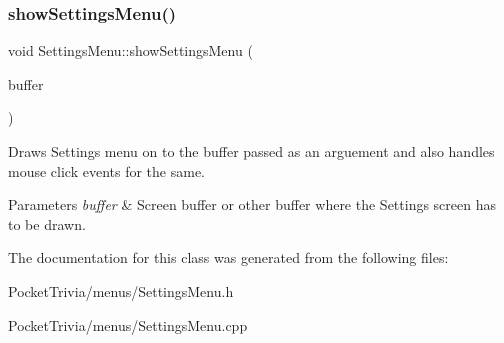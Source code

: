 \subsubsection{\texorpdfstring{showSettingsMenu()}{showSettingsMenu()}}
{\footnotesize\ttfamily void Settings\+Menu\+::show\+Settings\+Menu (\begin{DoxyParamCaption}\item[{B\+I\+T\+M\+AP $\ast$}]{buffer }\end{DoxyParamCaption})}



Draws Settings menu on to the buffer passed as an arguement and also handles mouse click events for the same. 


\begin{DoxyParams}{Parameters}
{\em buffer} & Screen buffer or other buffer where the Settings screen has to be drawn. \\
\hline
\end{DoxyParams}


The documentation for this class was generated from the following files\+:\begin{DoxyCompactItemize}
\item 
Pocket\+Trivia/menus/Settings\+Menu.\+h\item 
Pocket\+Trivia/menus/Settings\+Menu.\+cpp\end{DoxyCompactItemize}
